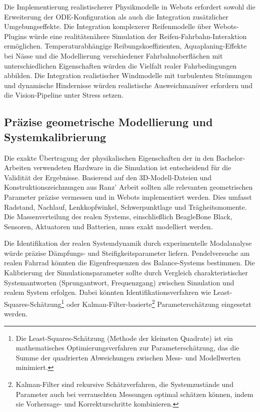 Die Implementierung realistischerer Physikmodelle in Webots erfordert sowohl die Erweiterung der ODE-Konfiguration als auch 
die Integration zusätzlicher Umgebungseffekte. Die Integration komplexerer Reifenmodelle über Webots-Plugins würde eine 
realitätsnähere Simulation der Reifen-Fahrbahn-Interaktion ermöglichen. Temperaturabhängige Reibungskoeffizienten, 
Aquaplaning-Effekte bei Nässe und die Modellierung verschiedener Fahrbahnoberflächen mit unterschiedlichen Eigenschaften 
würden die Vielfalt realer Fahrbedingungen abbilden. Die Integration realistischer Windmodelle mit turbulenten Strömungen 
und dynamische Hindernisse würden realistische Ausweichmanöver erfordern und die Vision-Pipeline unter Stress setzen.

\subsection{Präzise geometrische Modellierung und Systemkalibrierung}

Die exakte Übertragung der physikalischen Eigenschaften der in den Bachelor-Arbeiten verwendeten Hardware in die Simulation 
ist entscheidend für die Validität der Ergebnisse. Basierend auf den 3D-Modell-Dateien und Konstruktionszeichnungen aus Ranz' 
Arbeit sollten alle relevanten geometrischen Parameter präzise vermessen und in Webots implementiert werden. Dies umfasst 
Radstand, Nachlauf, Lenkkopfwinkel, Schwerpunktlage und Trägheitsmomente. Die Massenverteilung des realen Systems, 
einschließlich BeagleBone Black, Sensoren, Aktuatoren und Batterien, muss exakt modelliert werden.

Die Identifikation der realen Systemdynamik durch experimentelle Modalanalyse würde präzise Dämpfungs- und Steifigkeitsparameter 
liefern. Pendelversuche am realen Fahrrad könnten die Eigenfrequenzen des Balance-Systems bestimmen. Die Kalibrierung der 
Simulationsparameter sollte durch Vergleich charakteristischer Systemantworten (Sprungantwort, Frequenzgang) zwischen Simulation 
und realem System erfolgen. Dabei könnten Identifikationsverfahren wie Least-Squares-Schätzung\footnote{Die Least-Squares-Schätzung (Methode der kleinsten Quadrate) ist ein mathematisches Optimierungsverfahren zur Parameterschätzung, das die Summe der quadrierten Abweichungen zwischen Mess- und Modellwerten minimiert.} oder Kalman-Filter-basierte\footnote{Kalman-Filter sind rekursive Schätzverfahren, die Systemzustände und Parameter auch bei verrauschten Messungen optimal schätzen können, indem sie Vorhersage- und Korrekturschritte kombinieren.} 
Parameterschätzung eingesetzt werden.

